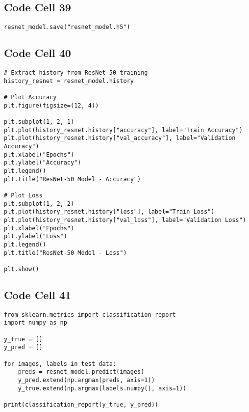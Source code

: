 \documentclass{article}
\begin{document}
\subsection*{Code Cell 39}
\begin{lstlisting}
resnet_model.save("resnet_model.h5")
\end{lstlisting}

\subsection*{Code Cell 40}
\begin{lstlisting}
# Extract history from ResNet-50 training
history_resnet = resnet_model.history

# Plot Accuracy
plt.figure(figsize=(12, 4))

plt.subplot(1, 2, 1)
plt.plot(history_resnet.history["accuracy"], label="Train Accuracy")
plt.plot(history_resnet.history["val_accuracy"], label="Validation Accuracy")
plt.xlabel("Epochs")
plt.ylabel("Accuracy")
plt.legend()
plt.title("ResNet-50 Model - Accuracy")

# Plot Loss
plt.subplot(1, 2, 2)
plt.plot(history_resnet.history["loss"], label="Train Loss")
plt.plot(history_resnet.history["val_loss"], label="Validation Loss")
plt.xlabel("Epochs")
plt.ylabel("Loss")
plt.legend()
plt.title("ResNet-50 Model - Loss")

plt.show()
\end{lstlisting}

\subsection*{Code Cell 41}
\begin{lstlisting}
from sklearn.metrics import classification_report
import numpy as np

y_true = []
y_pred = []

for images, labels in test_data:
    preds = resnet_model.predict(images)
    y_pred.extend(np.argmax(preds, axis=1))
    y_true.extend(np.argmax(labels.numpy(), axis=1))

print(classification_report(y_true, y_pred))
\end{lstlisting}
\end{document}
